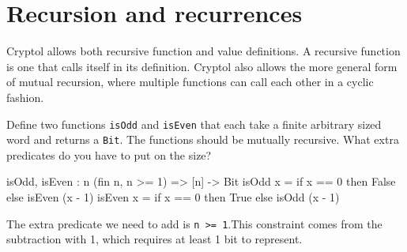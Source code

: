 \section{Recursion and recurrences}
\label{sec:recandrec}



Cryptol allows both recursive function and value definitions. A
recursive function is one that calls itself in its definition. Cryptol
also allows the more general form of mutual recursion, where multiple
functions can call each other in a cyclic
fashion.\indRecurrence\indRecursion


\begin{Exercise}\label{ex:recfun:1}
  Define two functions {\tt isOdd} and {\tt isEven} that each take
  a finite arbitrary sized word and returns a {\tt Bit}. The functions
  should be mutually recursive. What extra predicates do you have to
  put on the size?\indPredicates
\end{Exercise}
\begin{Answer}
\begin{code}
  isOdd, isEven : {n} (fin n, n >= 1) => [n] -> Bit
  isOdd  x = if x == 0 then False else isEven (x - 1)
  isEven x = if x == 0 then True  else isOdd  (x - 1)
\end{code}
The extra predicate we need to add is {\tt n >=
  1}.\indFin\indPredicates\indEq\indMinus This constraint comes from
the subtraction with 1, which requires at least 1 bit to represent.
\end{Answer}

